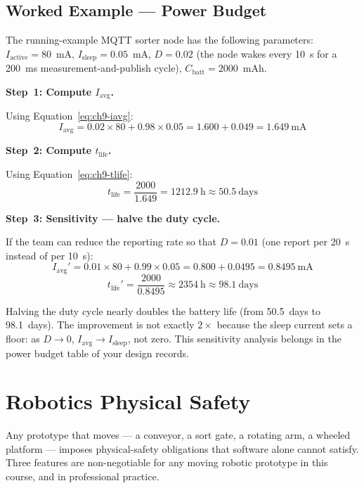 \subsection{Worked Example --- Power Budget}
\label{sec:ch9-power-worked}

The running-example MQTT sorter node has the following parameters:
$I_{\text{active}} = 80$~mA, $I_{\text{sleep}} = 0.05$~mA, $D = 0.02$
(the node wakes every 10~s for a 200~ms measurement-and-publish cycle),
$C_{\text{batt}} = 2000$~mAh.

\textbf{Step~1: Compute $I_{\text{avg}}$.}

Using Equation~\ref{eq:ch9-iavg}:
\[
  I_{\text{avg}} = 0.02 \times 80 + 0.98 \times 0.05
                = 1.600 + 0.049
                = 1.649~\text{mA}
\]

\textbf{Step~2: Compute $t_{\text{life}}$.}

Using Equation~\ref{eq:ch9-tlife}:
\[
  t_{\text{life}} = \frac{2000}{1.649} = 1212.9~\text{h} \approx 50.5~\text{days}
\]

\textbf{Step~3: Sensitivity --- halve the duty cycle.}

If the team can reduce the reporting rate so that $D = 0.01$ (one report per
20~s instead of per 10~s):
\[
  I_{\text{avg}}' = 0.01 \times 80 + 0.99 \times 0.05 = 0.800 + 0.0495 = 0.8495~\text{mA}
\]
\[
  t_{\text{life}}' = \frac{2000}{0.8495} \approx 2354~\text{h} \approx 98.1~\text{days}
\]

Halving the duty cycle nearly doubles the battery life (from 50.5~days to
98.1~days).
The improvement is not exactly $2\times$ because the sleep current sets a floor:
as $D \to 0$, $I_{\text{avg}} \to I_{\text{sleep}}$, not zero.
This sensitivity analysis belongs in the power budget table of your design
records.

\section{Robotics Physical Safety}
\label{sec:ch9-robot}

Any prototype that moves --- a conveyor, a sort gate, a rotating arm, a wheeled
platform --- imposes physical-safety obligations that software alone cannot
satisfy.
Three features are non-negotiable for any moving robotic prototype in this
course, and in professional practice.

